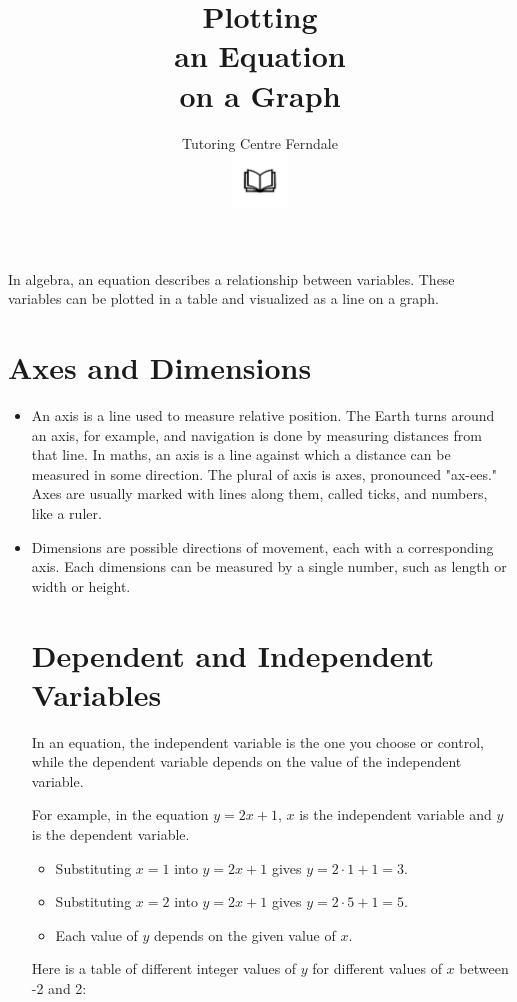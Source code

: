 \documentclass[12pt]{article}
\title{Plotting\\an Equation\\on a Graph}\\
\author{Tutoring Centre Ferndale\\
\includegraphics[width=4em]{ApS_logo.png}}
\date{}\\
\begin{document}
\maketitle

In algebra, an equation describes a relationship between variables. These variables can be plotted in a table and visualized as a line on a graph.

\section*{Axes and Dimensions}

\begin{itemize}
    \item An axis is a line used to measure relative position. The Earth turns around an axis, for example, and navigation is done by measuring distances from that line. In maths, an axis is a line against which a distance can be measured in some direction. The plural of axis is axes, pronounced "ax-ees." Axes are usually marked with lines along them, called ticks, and numbers, like a ruler.
    \item Dimensions are possible directions of movement, each with a corresponding axis. Each dimensions can be measured by a single number, such as length or width or height.

\newpage

\section*{Dependent and Independent Variables}

In an equation, the independent variable is the one you choose or control, while the dependent variable depends on the value of the independent variable.

For example, in the equation \( y = 2x + 1 \), \( x \) is the independent variable and \( y \) is the dependent variable.

\begin{itemize}
    \item Substituting $x=1$ into $y=2x+1$ gives $y=2\cdot1+1=3$.
    \item Substituting $x=2$ into $y=2x+1$ gives $y=2\cdot5+1=5$.
    \item Each value of $y$ depends on the given value of $x$.
\end{itemize}

Here is a table of different integer values of $y$ for different values of $x$ between -2 and 2:


\end{itemize}
\end{document}
